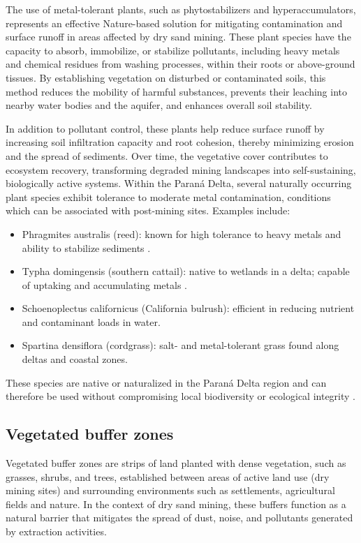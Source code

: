 The use of metal-tolerant plants, such as phytostabilizers and hyperaccumulators, represents an effective Nature-based solution for mitigating contamination and surface runoff in areas affected by dry sand mining. These plant species have the capacity to absorb, immobilize, or stabilize pollutants, including heavy metals and chemical residues from washing processes, within their roots or above-ground tissues. By establishing vegetation on disturbed or contaminated soils, this method reduces the mobility of harmful substances, prevents their leaching into nearby water bodies and the aquifer, and enhances overall soil stability.

In addition to pollutant control, these plants help reduce surface runoff by increasing soil infiltration capacity and root cohesion, thereby minimizing erosion and the spread of sediments. Over time, the vegetative cover contributes to ecosystem recovery, transforming degraded mining landscapes into self-sustaining, biologically active systems.
Within the Paraná Delta, several naturally occurring plant species exhibit tolerance to moderate metal contamination, conditions which can be associated with post-mining sites. Examples include:

\begin{itemize}
    \item Phragmites australis (reed): known for high tolerance to heavy metals and ability to stabilize sediments \autocite{popaHeavyMetalsAccumulation2023}.
    \item Typha domingensis (southern cattail): native to wetlands in a delta; capable of uptaking and accumulating metals \autocite{solimanTyphaDomingensisPers2024}.
    \item Schoenoplectus californicus (California bulrush): efficient in reducing nutrient and contaminant loads in water.
    \item Spartina densiflora (cordgrass): salt- and metal-tolerant grass found along deltas and coastal zones.
\end{itemize}

These species are native or naturalized in the Paraná Delta region and can therefore be used without compromising local biodiversity or ecological integrity \autocite{m.eidPhytoremediationHeavyMetals2020}. 

\subsection{Vegetated buffer zones}
Vegetated buffer zones are strips of land planted with dense vegetation, such as grasses, shrubs, and trees, established between areas of active land use (dry mining sites) and surrounding environments such as settlements, agricultural fields and nature. In the context of dry sand mining, these buffers function as a natural barrier that mitigates the spread of dust, noise, and pollutants generated by extraction activities.

